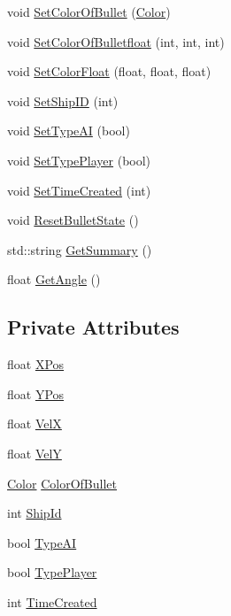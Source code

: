 \begin{DoxyCompactItemize}
\item 
void \hyperlink{classBullet_a161ebe9f88bbc9cb727bd4da71616367}{Set\-Color\-Of\-Bullet} (\hyperlink{classColor}{Color})
\item 
void \hyperlink{classBullet_a464d27c8b417f0a25f76102e8bfcec5c}{Set\-Color\-Of\-Bulletfloat} (int, int, int)
\item 
void \hyperlink{classBullet_aeb22fa988afe4519cb65addc6ff0d363}{Set\-Color\-Float} (float, float, float)
\item 
void \hyperlink{classBullet_ae1f001c71db9e1f5eb08e0047ff1eb1a}{Set\-Ship\-I\-D} (int)
\item 
void \hyperlink{classBullet_a4a17a8e806971a02302c32c2d0331d1d}{Set\-Type\-A\-I} (bool)
\item 
void \hyperlink{classBullet_a631e35cfde7dc1c1f47477008122d9cf}{Set\-Type\-Player} (bool)
\item 
void \hyperlink{classBullet_a34f095b721d0ad0b04345c8861fa4c73}{Set\-Time\-Created} (int)
\item 
void \hyperlink{classBullet_a7c74be5f1cc64746275ef712b5d2629f}{Reset\-Bullet\-State} ()
\item 
std\-::string \hyperlink{classBullet_a5c5905ba79f88856d8180cafd4273aeb}{Get\-Summary} ()
\item 
float \hyperlink{classBullet_a0c2fca544c1a34f030f7a619969e384a}{Get\-Angle} ()
\end{DoxyCompactItemize}
\subsection*{Private Attributes}
\begin{DoxyCompactItemize}
\item 
float \hyperlink{classBullet_a0516664a95082588f240ea392bb90e38}{X\-Pos}
\item 
float \hyperlink{classBullet_a8f577dfde29bbcfcbdb343c888f391d9}{Y\-Pos}
\item 
float \hyperlink{classBullet_a4d587ab4f71d1f6d3681507b04674bfb}{Vel\-X}
\item 
float \hyperlink{classBullet_a567e3c286f1e47015314b7ef141cf8d9}{Vel\-Y}
\item 
\hyperlink{classColor}{Color} \hyperlink{classBullet_a9f3fc8ac1cfc3fe6fe154d4a7065b3bb}{Color\-Of\-Bullet}
\item 
int \hyperlink{classBullet_a1a70e1a43ad5f248ebc62214247d3c7b}{Ship\-Id}
\item 
bool \hyperlink{classBullet_ae2f8ea9d3c700fc27efafec7d540404a}{Type\-A\-I}
\item 
bool \hyperlink{classBullet_ac1315818abe9b9c337af21b14c282868}{Type\-Player}
\item 
int \hyperlink{classBullet_ab5cc1b11c455b72423ba9a91962dab6b}{Time\-Created}
\end{DoxyCompactItemize}


